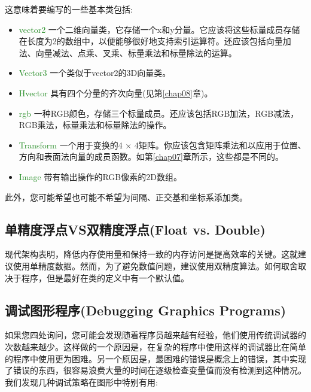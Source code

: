 这意味着要编写的一些基本类包括:

\begin{itemize}
	\item  \textcolor{ForestGreen}{vector2} 一个二维向量类，它存储一个x和y分量。它应该将这些标量成员存储在长度为2的数组中，以便能够很好地支持索引运算符。还应该包括向量加法、向量减法、点乘、叉乘、标量乘法和标量除法的运算。
	
	\item  \textcolor{ForestGreen}{Vector3} 一个类似于vector2的3D向量类。
	
	\item  \textcolor{ForestGreen}{Hvector} 具有四个分量的齐次向量(见第\ref{chap08}章)。
	
	\item  \textcolor{ForestGreen}{rgb} 一种RGB颜色，存储三个标量成员。还应该包括RGB加法，RGB减法，RGB乘法，标量乘法和标量除法的操作。
	
	\item  \textcolor{ForestGreen}{Transform} 一个用于变换的4 × 4矩阵。你应该包含矩阵乘法和以应用于位置、方向和表面法向量的成员函数。如第\ref{chap07}章所示，这些都是不同的。
	
	\item  \textcolor{ForestGreen}{Image} 带有输出操作的RGB像素的2D数组。
\end{itemize}

此外，您可能希望也可能不希望为间隔、正交基和坐标系添加类。

\subsection{单精度浮点VS双精度浮点(Float vs. Double)} 

现代架构表明，降低内存使用量和保持一致的内存访问是提高效率的关键。这就建议使用单精度数据。然而，为了避免数值问题，建议使用双精度算法。如何取舍取决于程序，但是最好在类的定义中有一个默认值。

\subsection{调试图形程序(Debugging Graphics Programs)} 

如果您四处询问，您可能会发现随着程序员越来越有经验，他们使用传统调试器的次数越来越少。这样做的一个原因是，在复杂的程序中使用这样的调试器比在简单的程序中使用更为困难。另一个原因是，最困难的错误是概念上的错误，其中实现了错误的东西，很容易浪费大量的时间在逐级检查变量值而没有检测到这种情况。我们发现几种调试策略在图形中特别有用:

